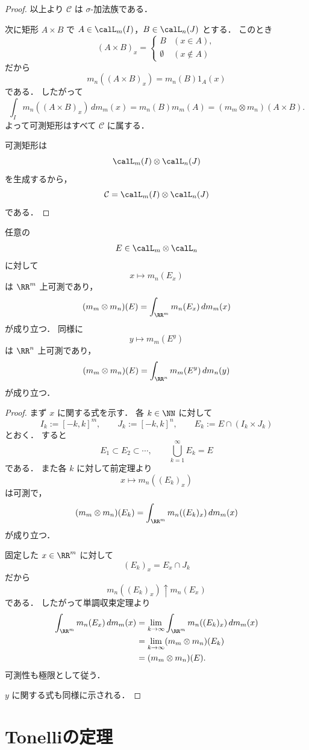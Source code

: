 \begin{proof}
以上より $\mathcal C$ は $\sigma$-加法族である．

次に矩形 $A\times B$ で
$A\in\calL_m(I)$，$B\in\calL_n(J)$ とする．
このとき
\[
(A\times B)_x
=
\begin{cases}
B & (x\in A),\\
\emptyset & (x\notin A)
\end{cases}
\]
だから
\[
m_n((A\times B)_x)=m_n(B)1_A(x)
\]
である．
したがって
\[
\int_I m_n((A\times B)_x)\,dm_m(x)
=
m_n(B)m_m(A)
=
(m_m\otimes m_n)(A\times B).
\]
よって可測矩形はすべて $\mathcal C$ に属する．

可測矩形は
\[
\calL_m(I)\otimes\calL_n(J)
\]
を生成するから，
\[
\mathcal C=\calL_m(I)\otimes\calL_n(J)
\]
である．
\end{proof}

\begin{theorem}[一般の集合]
任意の
\[
E\in\calL_m\otimes\calL_n
\]
に対して
\[
x\longmapsto m_n(E_x)
\]
は $\RR^m$ 上可測であり，
\[
(m_m\otimes m_n)(E)=\int_{\RR^m}m_n(E_x)\,dm_m(x)
\]
が成り立つ．
同様に
\[
y\longmapsto m_m(E^y)
\]
は $\RR^n$ 上可測であり，
\[
(m_m\otimes m_n)(E)=\int_{\RR^n}m_m(E^y)\,dm_n(y)
\]
が成り立つ．
\end{theorem}
\begin{proof}
まず $x$ に関する式を示す．
各 $k\in\NN$ に対して
\[
I_k:=[-k,k]^m,\qquad J_k:=[-k,k]^n,
\qquad
E_k:=E\cap (I_k\times J_k)
\]
とおく．
すると
\[
E_1\subset E_2\subset \cdots,\qquad
\bigcup_{k=1}^{\infty}E_k=E
\]
である．
また各 $k$ に対して前定理より
\[
x\mapsto m_n((E_k)_x)
\]
は可測で，
\[
(m_m\otimes m_n)(E_k)=\int_{\RR^m}m_n((E_k)_x)\,dm_m(x)
\]
が成り立つ．

固定した $x\in\RR^m$ に対して
\[
(E_k)_x=E_x\cap J_k
\]
だから
\[
m_n((E_k)_x)\uparrow m_n(E_x)
\]
である．
したがって単調収束定理より
\begin{align*}
\int_{\RR^m}m_n(E_x)\,dm_m(x)
&=
\lim_{k\to\infty}\int_{\RR^m}m_n((E_k)_x)\,dm_m(x) \\
&=
\lim_{k\to\infty}(m_m\otimes m_n)(E_k) \\
&=
(m_m\otimes m_n)(E).
\end{align*}
可測性も極限として従う．

$y$ に関する式も同様に示される．
\end{proof}

\section{Tonelliの定理}

